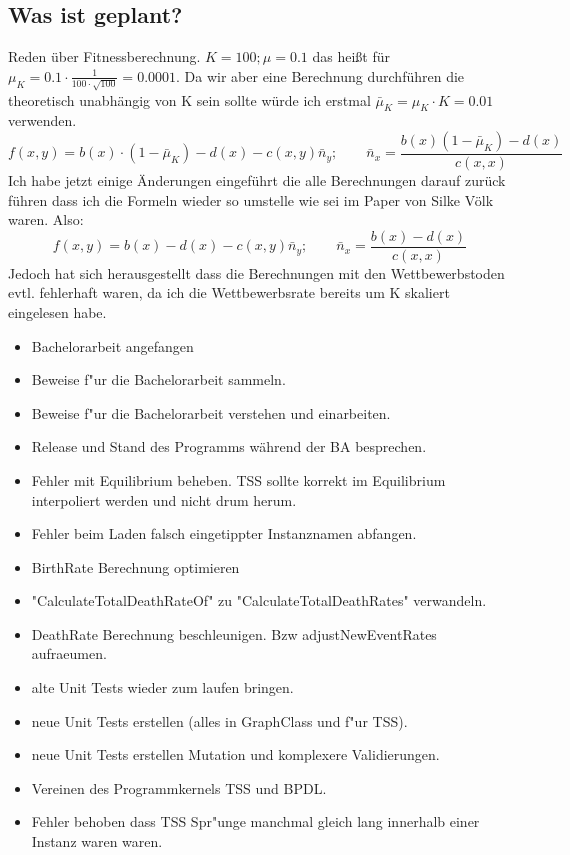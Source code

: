 \documentclass{article}
\begin{document}
\subsection{Was ist geplant?}
	Reden über Fitnessberechnung. $ K = 100; \mu = 0.1 $ das heißt für $ \mu_K = 0.1 \cdot \frac{1}{100\cdot \sqrt{100}} = 0.0001$. Da wir aber eine Berechnung durchführen die theoretisch unabhängig von K sein sollte würde ich erstmal $ \bar{\mu}_K = \mu_K \cdot K = 0.01 $ verwenden.
	\[ f(x,y) = b(x) \cdot (1 - \bar{\mu}_K) - d(x) - c(x,y)\bar{n}_y; \qquad \bar{n}_x = \frac{b(x)(1-\bar{\mu}_K) - d(x)}{c(x,x)}\]
	Ich habe jetzt einige Änderungen eingeführt die alle Berechnungen darauf zurück führen dass ich die Formeln wieder so umstelle wie sei im Paper von Silke Völk waren. Also:
	\[ f(x,y) = b(x) - d(x) - c(x,y)\bar{n}_y; \qquad \bar{n}_x = \frac{b(x) - d(x)}{c(x,x)}\]
	Jedoch hat sich herausgestellt dass die Berechnungen mit den Wettbewerbstoden evtl. fehlerhaft waren, da ich die Wettbewerbsrate bereits um K skaliert eingelesen habe.
	\begin{itemize}
		\item Bachelorarbeit angefangen \CheckedBox
		\item Beweise f"ur die Bachelorarbeit sammeln. \CheckedBox
		\item Beweise f"ur die Bachelorarbeit verstehen und einarbeiten. \Square
		\item Release und Stand des Programms während der BA besprechen. \Square
		\item Fehler mit Equilibrium beheben. TSS sollte korrekt im Equilibrium interpoliert werden und nicht drum herum. \CheckedBox
		\item Fehler beim Laden falsch eingetippter Instanznamen abfangen. \CheckedBox
		\item BirthRate Berechnung optimieren \CheckedBox
		\item "{}CalculateTotalDeathRateOf"{} zu "{}CalculateTotalDeathRates"{} verwandeln. \CheckedBox
		\item DeathRate Berechnung beschleunigen. Bzw adjustNewEventRates aufraeumen.\Square
		\item alte Unit Tests wieder zum laufen bringen. \CheckedBox
		\item neue Unit Tests erstellen (alles in GraphClass und f"ur TSS). \Square
		\item neue Unit Tests erstellen Mutation und komplexere Validierungen. \CheckedBox
		\item Vereinen des Programmkernels TSS und BPDL. \XBox
		\item Fehler behoben dass TSS Spr"unge manchmal gleich lang innerhalb einer Instanz waren waren. \CheckedBox
	\end{itemize}
\end{document}
